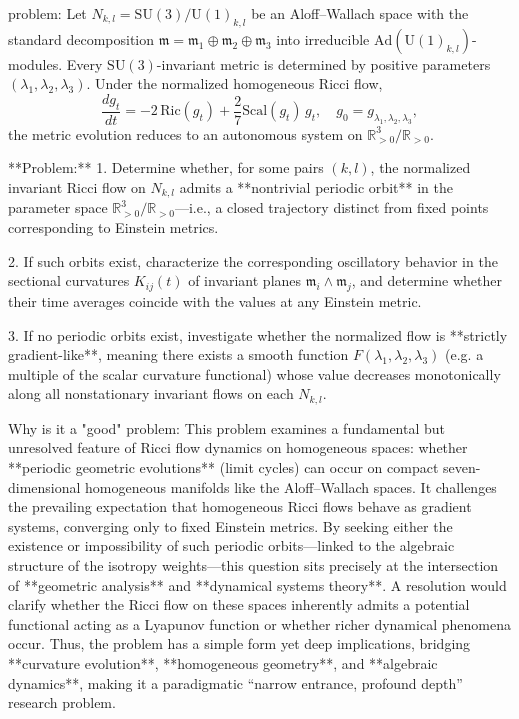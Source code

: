 problem:  
Let \( N_{k,l} = \mathrm{SU}(3)/\mathrm{U}(1)_{k,l} \) be an Aloff–Wallach space with the standard decomposition \( \mathfrak{m} = \mathfrak{m}_1 \oplus \mathfrak{m}_2 \oplus \mathfrak{m}_3 \) into irreducible \(\mathrm{Ad}(\mathrm{U}(1)_{k,l})\)-modules. Every \(\mathrm{SU}(3)\)-invariant metric is determined by positive parameters \((\lambda_1,\lambda_2,\lambda_3)\).  
Under the normalized homogeneous Ricci flow,
\[
\frac{d g_t}{d t} = -2\,\mathrm{Ric}(g_t) + \frac{2}{7}\mathrm{Scal}(g_t)\,g_t,
\quad g_0 = g_{\lambda_1,\lambda_2,\lambda_3},
\]
the metric evolution reduces to an autonomous system on \( \mathbb{R}_{>0}^3 / \mathbb{R}_{>0} \).  

**Problem:**  
1. Determine whether, for some pairs \((k,l)\), the normalized invariant Ricci flow on \(N_{k,l}\) admits a **nontrivial periodic orbit** in the parameter space \( \mathbb{R}_{>0}^3 / \mathbb{R}_{>0} \)—i.e., a closed trajectory distinct from fixed points corresponding to Einstein metrics.  

2. If such orbits exist, characterize the corresponding oscillatory behavior in the sectional curvatures \(K_{ij}(t)\) of invariant planes \( \mathfrak{m}_i \wedge \mathfrak{m}_j \), and determine whether their time averages coincide with the values at any Einstein metric.  

3. If no periodic orbits exist, investigate whether the normalized flow is **strictly gradient-like**, meaning there exists a smooth function \(F(\lambda_1,\lambda_2,\lambda_3)\) (e.g. a multiple of the scalar curvature functional) whose value decreases monotonically along all nonstationary invariant flows on each \(N_{k,l}\).  

Why is it a "good" problem:  
This problem examines a fundamental but unresolved feature of Ricci flow dynamics on homogeneous spaces: whether **periodic geometric evolutions** (limit cycles) can occur on compact seven-dimensional homogeneous manifolds like the Aloff–Wallach spaces. It challenges the prevailing expectation that homogeneous Ricci flows behave as gradient systems, converging only to fixed Einstein metrics.  
By seeking either the existence or impossibility of such periodic orbits—linked to the algebraic structure of the isotropy weights—this question sits precisely at the intersection of **geometric analysis** and **dynamical systems theory**.  
A resolution would clarify whether the Ricci flow on these spaces inherently admits a potential functional acting as a Lyapunov function or whether richer dynamical phenomena occur. Thus, the problem has a simple form yet deep implications, bridging **curvature evolution**, **homogeneous geometry**, and **algebraic dynamics**, making it a paradigmatic “narrow entrance, profound depth” research problem.